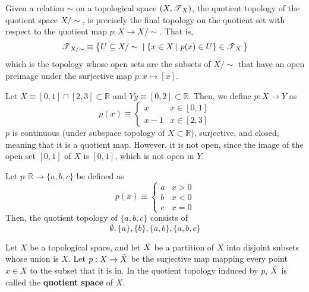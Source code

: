   \begin{proposition}
    Given a relation $\sim$ on a topological space $(X, \operatorname{\mathscr{T}}_X)$, the quotient topology of the quotient space $X / \sim$, is precisely the final topology on the quotient set with respect to the quotient map $p: X \rightarrow X / \sim$. That is, 
    \begin{equation}
      \operatorname{\mathscr{T}}_{X / \sim} \equiv \big\{U \subseteq X / \sim \; | \; \{x \in X \; | \; p(x) \in U\} \in \operatorname{\mathscr{T}}_X \big\}
    \end{equation}
    which is the topology whose open sets are the subsets of $X / \sim$ that have an open preimage under the surjective map $p: x \mapsto [x]$. 
  \end{proposition}

  \begin{example}
    Let $X \equiv [0,1] \cap [2,3] \subset \mathbb{R}$ and $Y y \equiv [0,2] \subset \mathbb{R}$. Then, we define $p: X \rightarrow Y$ as 
    \begin{equation}
      p(x) \equiv \begin{cases} x & x \in [0,1] \\ x-1 & x \in [2,3] \end{cases}
    \end{equation}
    $p$ is continuous (under subspace topology of $X \subset \mathbb{R}$), surjective, and closed, meaning that it is a quotient map. However, it is not open, since the image of the open set $[0,1]$ of $X$ is $[0,1]$, which is not open in $Y$. 
  \end{example}

  \begin{example}
    Let $p: \mathbb{R} \rightarrow \{a, b, c\}$ be defined as 
    \begin{equation}
      p(x) \equiv \begin{cases} a & x > 0 \\ b & x < 0 \\ c & x = 0 \end{cases}
    \end{equation}
    Then, the quotient topology of $\{a, b, c\}$ consists of 
    \begin{equation}
      \emptyset, \{a\}, \{b\}, \{a, b\}, \{a, b, c\}
    \end{equation}
  \end{example}

  \begin{definition}
    Let $X$ be a topological space, and let $\Tilde{X}$ be a partition of $X$ into disjoint subsets whose union is $X$. Let $p: X \rightarrow \Tilde{X}$ be the surjective map mapping every point $x \in X$ to the subset that it is in. In the quotient topology induced by $p$, $\Tilde{X}$ is called the \textbf{quotient space} of $X$. 
  \end{definition}

